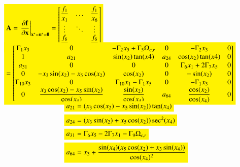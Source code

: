 \documentclass[3p]{elsarticle}
\begin{document}
\begin{align}
    \begin{minipage}[c][1.5cm][c]{\linewidth}
        \colorbox{yellow}{$\mathbf{A} = \left.\dfrac{\partial \mathbf{f}}{\partial \mathbf{x}}\right|_{\boldsymbol{{\mathrm{x}}}^*= \boldsymbol{{\mathrm{u}}}^*=\boldsymbol{0}} = \begin{bmatrix}
            \dfrac{f_1}{x_1} & \dots & \dfrac{f_1}{x_6} \\
            \vdots & \ddots & \vdots \\
            \dfrac{f_6}{x_1} & \dots & \dfrac{f_6}{x_6}
        \end{bmatrix}$}
    \end{minipage} \\[10pt]
    \begin{minipage}[c][2cm][c]{\linewidth}
        \colorbox{yellow}{$=\begin{bmatrix}
            \Gamma_1 x_3 & 0 & -\Gamma_2 x_5  + \Gamma_5 \Omega_{c, r} & 0 &  - \Gamma_2 x_3 & 0 \\
            1 & a_{21} & \sin(x_2)\tan(x4) & a_{24} & \cos(x_2)\tan(x4) & 0 \\
            a_{31} & 0 & 0 & 0 & \Gamma_6 x_1 + 2\Gamma_7 x_5 & 0 \\
            0 & -x_3\sin(x_2) - x_5\cos(x_2)  & \cos(x_2) & 0 & -\sin(x_2) & 0 \\
            \Gamma_{10} x_3 & 0 & \Gamma_{10} x_1 - \Gamma_1 x_5 & 0 & -\Gamma_1 x_3 & 0 \\
            0 & \dfrac{x_3\cos(x_2)-x_5\sin(x_2)}{\cos(x_4)} & \dfrac{\sin(x_2)}{\cos(x_4)} & a_{64} & \dfrac{\cos(x_2)}{\cos(x_4)} & 0
        \end{bmatrix}$}
    \end{minipage}
\end{align}


    

\begin{align}
    &\colorbox{yellow}{$a_{21} = (x_3\cos(x_2)-x_5\sin(x_2))\tan(x_4)$} \\
    &\colorbox{yellow}{$a_{24} = (x_3\sin(x_2)+x_5\cos(x_2))\sec^2(x_4)$} \\
    &\colorbox{yellow}{$a_{31} = \Gamma_6 x_5 - 2\Gamma_7 x_1 - \Gamma_9\Omega_{c, r}$} \\
    &\colorbox{yellow}{$a_{64} = x_3 + \dfrac{\sin(x_4)(x_5\cos(x_2) + x_3\sin(x_4))}{\cos(x_4)^2}$}
\end{align}
\end{document}
